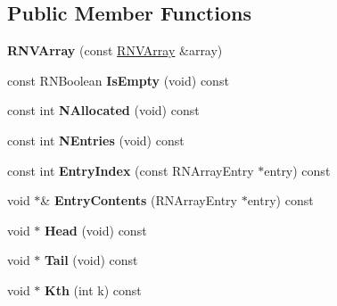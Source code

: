 \subsection*{Public Member Functions}
\begin{DoxyCompactItemize}
\item 
{\bfseries R\+N\+V\+Array} (const \hyperlink{class_r_n_v_array}{R\+N\+V\+Array} \&array)\hypertarget{class_r_n_v_array_ae2a68e9f4768571590c43089ad6518ca}{}\label{class_r_n_v_array_ae2a68e9f4768571590c43089ad6518ca}

\item 
const R\+N\+Boolean {\bfseries Is\+Empty} (void) const \hypertarget{class_r_n_v_array_a6b41743130441bb0b0338bab9f82f12e}{}\label{class_r_n_v_array_a6b41743130441bb0b0338bab9f82f12e}

\item 
const int {\bfseries N\+Allocated} (void) const \hypertarget{class_r_n_v_array_a2097fec085ed3eba3f37a372afa2bbdd}{}\label{class_r_n_v_array_a2097fec085ed3eba3f37a372afa2bbdd}

\item 
const int {\bfseries N\+Entries} (void) const \hypertarget{class_r_n_v_array_aa93daca4c1d77c575b74d1b41fd04818}{}\label{class_r_n_v_array_aa93daca4c1d77c575b74d1b41fd04818}

\item 
const int {\bfseries Entry\+Index} (const R\+N\+Array\+Entry $\ast$entry) const \hypertarget{class_r_n_v_array_a85c0749f8fdbb750fb8e67d674134592}{}\label{class_r_n_v_array_a85c0749f8fdbb750fb8e67d674134592}

\item 
void $\ast$\& {\bfseries Entry\+Contents} (R\+N\+Array\+Entry $\ast$entry) const \hypertarget{class_r_n_v_array_af0c30b0e82be99a52a5d42825154aece}{}\label{class_r_n_v_array_af0c30b0e82be99a52a5d42825154aece}

\item 
void $\ast$ {\bfseries Head} (void) const \hypertarget{class_r_n_v_array_aa761a05fda19810cc5dd4706d0b202df}{}\label{class_r_n_v_array_aa761a05fda19810cc5dd4706d0b202df}

\item 
void $\ast$ {\bfseries Tail} (void) const \hypertarget{class_r_n_v_array_ad93f1e91fd4cb91bdde272db8f1bac37}{}\label{class_r_n_v_array_ad93f1e91fd4cb91bdde272db8f1bac37}

\item 
void $\ast$ {\bfseries Kth} (int k) const \hypertarget{class_r_n_v_array_ab1e94e0c88a3f1f679c2454c34dffc1c}{}\label{class_r_n_v_array_ab1e94e0c88a3f1f679c2454c34dffc1c}


\end{DoxyCompactItemize}
